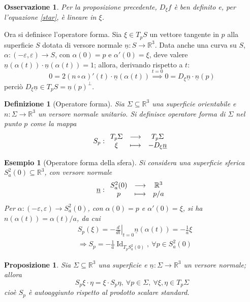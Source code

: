 \documentclass[12pt]{scrartcl}
\theoremstyle{style}
\newtheorem{esempio}{Esempio}[section]
\newtheorem{definizione}{Definizione}[section]
\newtheorem{prop}{Proposizione}[section]
\newtheorem{osservazione}{Osservazione}[section]
\newcommand*\Eval[3]{\left.#1\right\rvert_{#2}^{#3}}
\numberwithin{equation}{subsection}
\begin{document}
\begin{osservazione}
	Per la proposizione precedente, $D_\xi f$ \`e ben definito e, per l'equazione \ref{star}, \`e lineare in $\xi $.
\end{osservazione}
\noindent Ora si definisce l'operatore forma.
Sia $\xi \in T_pS$ un vettore tangente in $p$ alla superficie $S$ dotata di versore normale $\underline{n}:S\to \mathbb{R}^3$.
Data anche una curva su $S$, $\alpha : (-\varepsilon ,\varepsilon )\to S$, con $\alpha (0) = p$ e $\alpha '(0) = \xi $, deve valere $\underline{n}(\alpha (t)) \cdot \underline{n}(\alpha (t)) = 1$; allora, derivando rispetto a $t$:
\[
	0 = 2 (n\circ \alpha )' (t) \cdot \underline{n}(\alpha (t)) \stackrel{t=0}{\implies} 0 = D_\xi \underline{n}\cdot \underline{n}(p)
\] 
perci\`o $D_\xi \underline{n} \in T_p S = \underline{n}(p)^\perp$.
\begin{definizione}
	[Operatore forma]
	Sia $\Sigma \subseteq\mathbb{R}^3$ una superficie orientabile e $n : \Sigma \to \mathbb{R}^3$ un versore normale unitario.
	Si definisce \textit{operatore forma} di $\Sigma$ nel punto $p$ come la mappa
	\[
	S_p :
	\begin{array}
		{c c c}
		T_p\Sigma & \longrightarrow & T_p \Sigma\\
		\xi & \longmapsto& - D_\xi \underline{n}
	\end{array}
	\] 
\end{definizione}
\begin{esempio}
	[Operatore forma della sfera]
	Si considera una superficie sferica $S^2_a(0) \subseteq \mathbb{R}^3$, con versore normale
	\[
	\underline{n}:
	\begin{array}
		{c c c}
		S_a^2(0) &\longrightarrow & \mathbb{R}^3\\
		p & \longmapsto & p / a
	\end{array}
	\] 
	Per $\alpha :(-\varepsilon ,\varepsilon ) \to S_a^2 (0)$, con $\alpha (0) = p$ e $\alpha '(0) = \xi $, si ha $n(\alpha (t)) = \alpha (t) / a$, da cui
	\[
		\begin{split}
			&S_p (\xi ) = - \Eval{\frac{d }{d t} }{t=0}{}\underline{n}(\alpha (t)) = -\frac{1}{a} \xi \\
			&\Rightarrow S_p = -\frac{1}{a} \operatorname{Id} _{T_pS^2_a(0)} , \ \forall p \in S_a^2 (0)
		\end{split}
	\] 
\end{esempio}
\begin{prop}
	Sia $\Sigma \subseteq \mathbb{R}^3$ una superficie e $\underline{n}:\Sigma \to \mathbb{R}^3$ un versore normale; allora
	\[
	S_p\xi  \cdot \eta = \xi \cdot S_p \eta , \ \forall p \in \Sigma, \ \forall \xi ,\eta \in T_p\Sigma
	\] 
	cio\`e $S_p$ \`e autoaggiunto rispetto al prodotto scalare standard.
\end{prop}
\end{document}
